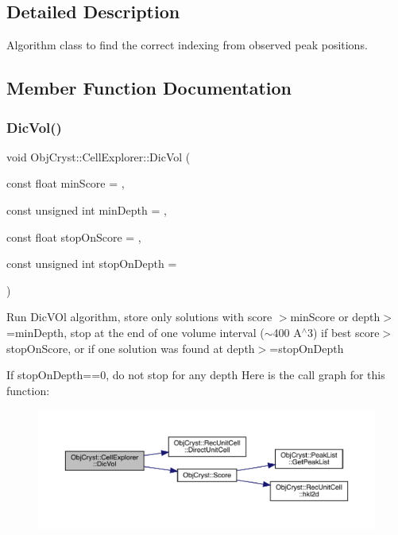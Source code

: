 \subsection{Detailed Description}
Algorithm class to find the correct indexing from observed peak positions. 

\subsection{Member Function Documentation}
\mbox{\label{class_obj_cryst_1_1_cell_explorer_adba0983c3b1dc6846ccf0d9ee7dbfa98}} 
\subsubsection{\texorpdfstring{DicVol()}{DicVol()}}
{\footnotesize\ttfamily void Obj\+Cryst\+::\+Cell\+Explorer\+::\+Dic\+Vol (\begin{DoxyParamCaption}\item[{const float}]{min\+Score = {},  }\item[{const unsigned int}]{min\+Depth = {},  }\item[{const float}]{stop\+On\+Score = {},  }\item[{const unsigned int}]{stop\+On\+Depth = {} }\end{DoxyParamCaption})}

Run Dic\+V\+Ol algorithm, store only solutions with score $>$min\+Score or depth$>$=min\+Depth, stop at the end of one volume interval ($\sim$400 A$^\wedge$3) if best score$>$stop\+On\+Score, or if one solution was found at depth$>$=stop\+On\+Depth

If stop\+On\+Depth==0, do not stop for any depth Here is the call graph for this function\+:
\nopagebreak
\begin{figure}[H]
\begin{center}
\leavevmode
\includegraphics[width=350pt]{class_obj_cryst_1_1_cell_explorer_adba0983c3b1dc6846ccf0d9ee7dbfa98_cgraph}
\end{center}
\end{figure}
\mbox{\label{class_obj_cryst_1_1_cell_explorer_ae32d743e1e6df33e09243cd7bb9a8c52}} 
